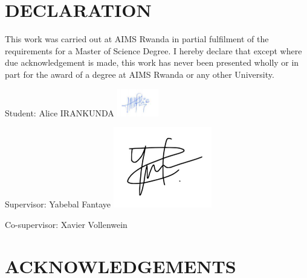 \chapter*{DECLARATION}
%
%
%
%
%

This work was carried out at AIMS Rwanda in partial fulfilment of the requirements for a Master
of Science Degree.
I hereby declare that except where due acknowledgement is made, this work has never been
presented wholly or in part for the award of a degree at AIMS Rwanda or any other University.


Student: Alice IRANKUNDA  \includegraphics[height=1.2cm]{images/alice.png}


Supervisor: Yabebal Fantaye
\includegraphics[scale=.3]{images/yabe.png} 
 
Co-supervisor: Xavier Vollenwein


\newpage

\chapter*{ACKNOWLEDGEMENTS}

